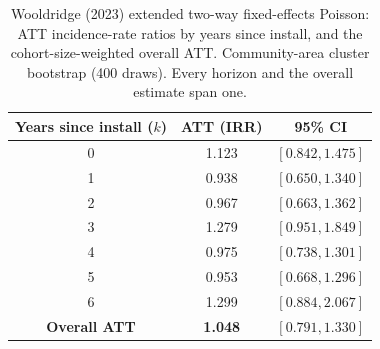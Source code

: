 \documentclass[12pt]{article}
\begin{document}
\begin{table}[H]
\centering
\small
\caption{Wooldridge (2023) extended two-way fixed-effects Poisson: ATT incidence-rate
ratios by years since install, and the cohort-size-weighted overall ATT. Community-area
cluster bootstrap (400 draws). Every horizon and the overall estimate span one.}
\label{tab:etwfe}
\begin{tabular}{ccc}
\toprule
Years since install ($k$) & ATT (IRR) & 95\% CI \\
\midrule
0 & 1.123 & $[0.842, 1.475]$ \\
1 & 0.938 & $[0.650, 1.340]$ \\
2 & 0.967 & $[0.663, 1.362]$ \\
3 & 1.279 & $[0.951, 1.849]$ \\
4 & 0.975 & $[0.738, 1.301]$ \\
5 & 0.953 & $[0.668, 1.296]$ \\
6 & 1.299 & $[0.884, 2.067]$ \\
\midrule
\textbf{Overall ATT} & \textbf{1.048} & $[0.791, 1.330]$ \\
\bottomrule
\end{tabular}
\end{table}
\end{document}
